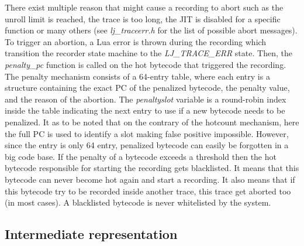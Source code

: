 There exist multiple reason that might cause a recording to abort such as
the unroll limit is reached, the trace is too long, the
JIT is disabled for a specific function or many others (see \emph{lj\_traceerr.h}
for the list of possible abort messages). To trigger an abortion, a Lua error is
thrown during the recording which transition the recorder state machine to the
\emph{LJ\_TRACE\_ERR} state. Then, the \emph{penalty\_pc} function is called on
the hot bytecode that triggered the recording. The penalty mechanism consists of
a 64-entry table, where each entry is a structure containing the exact PC of the
penalized bytecode, the penalty value, and the reason of the abortion. The
\emph{penaltyslot} variable is a round-robin index inside the table indicating
the next entry to use if a new bytecode needs to be penalized. It as to be noted
that on the contrary of the hotcount mechanism, here the full PC is used to
identify a slot making false positive impossible. However, since the entry is
only 64 entry, penalized bytecode can easily be forgotten in a big code base.
If the penalty of a bytecode exceeds a threshold then the hot bytecode
responsible for starting the recording gets blacklisted. It means that this
bytecode can never become hot again and start a recording. It also means that if this
bytecode try to be recorded inside another trace, this trace get aborted too
(in most cases). A blacklisted bytecode is never whitelisted by the system.


\subsection{Intermediate representation}
\label{Subsec:IR}

